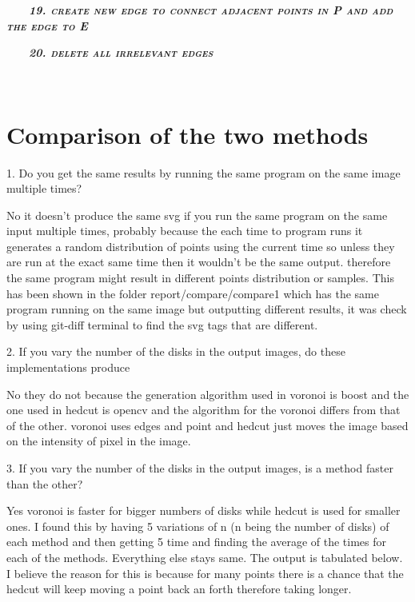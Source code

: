 \documentclass[11pt,a4paper]{article}
\begin{document}
\ \ \ \ \textbf{\textit{\textsc{\textsc{19. create new edge to
connect adjacent points in P and add the edge to E}}}}

\ \ \ \ \textbf{\textit{\textsc{\textsc{20. delete all irrelevant
edges}}}}



\ \ \ \ \textbf{\textit{\textsc{}}}

\item \textbf{\textit{\textsc{}}}

\section{Comparison of the two methods}

1. Do you get the same results by running the same program on the same
image multiple times?

No it doesn't produce the same svg if you run the same program on the
same input multiple times, probably because the each time to program
runs it generates a random distribution of points using the current time
so unless they are run at the exact same time then it wouldn't be the
same output. therefore the same program might result in different points
distribution or samples. This has been shown in the folder
report/compare/compare1 which has the same program running on the same image but
outputting different results, it was check by using git-diff terminal to
find the svg tags that are different.



2. If you vary the number of the disks in the output images, do these
implementations produce

No they do not because the generation algorithm used in voronoi is boost
and the one used in hedcut is opencv and the algorithm for the voronoi
differs from that of the other. voronoi uses edges and point and hedcut
just moves the image based on the intensity of pixel in the image.



3. If you vary the number of the disks in the output images, is a method
faster than the other?

Yes voronoi is faster for bigger numbers of disks while hedcut is used
for smaller ones. I found this by having 5 variations of n (n being the
number of disks) of each method and then getting 5 time and finding the
average of the times for each of the methods. Everything else stays
same. The output is tabulated below. I believe the reason for this is
because for many points there is a chance that the hedcut will keep
moving a point back an forth therefore taking longer.
\end{document}
